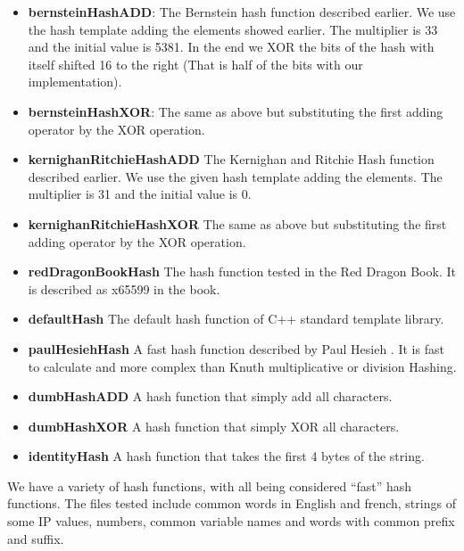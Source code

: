 \begin{itemize}
\item \textbf{bernsteinHashADD}: The Bernstein hash function described earlier. We use the hash template adding the elements showed earlier. The multiplier is 33 and the initial value is 5381. In the end we XOR the bits of the hash with itself shifted 16 to the right (That is half of the bits with our implementation).
  
\item \textbf{bernsteinHashXOR}: The same as above but substituting the first adding operator by the XOR operation.

\item \textbf{kernighanRitchieHashADD} The Kernighan and Ritchie Hash function described earlier. We use the given hash template adding the elements. The multiplier is 31 and the initial value is 0.

\item \textbf{kernighanRitchieHashXOR} The same as above but substituting the first adding operator by the XOR operation.

\item \textbf{redDragonBookHash} The hash function tested in the Red Dragon Book. It is described as x65599 in the book.

\item \textbf{defaultHash} The default hash function of C++ standard template library.

\item \textbf{paulHesiehHash} A fast hash function described by Paul Hesieh \citep{PaulHesiehHash}. It is fast to calculate and more complex than Knuth multiplicative or division Hashing.
  
\item \textbf{dumbHashADD} A hash function that simply add all characters.

\item \textbf{dumbHashXOR} A hash function that simply XOR all characters.

\item \textbf{identityHash} A hash function that takes the first 4 bytes of the string.  
\end{itemize}

We have a variety of hash functions, with all being considered ``fast'' hash functions. The files tested include common words in English and french, strings of some IP values, numbers, common variable names and words with common prefix and suffix.


